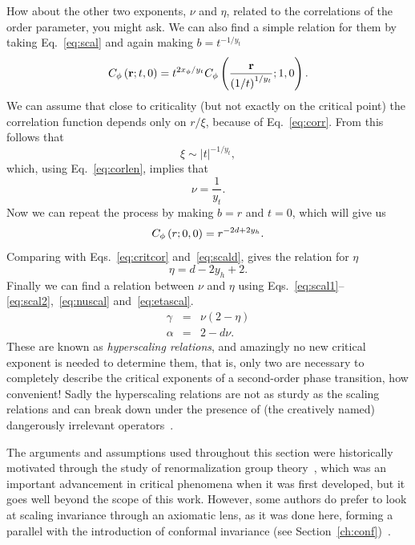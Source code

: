 How about the other two exponents, $\nu$ and $\eta$, related to the
correlations of the order parameter, you might ask. We can also find a simple
relation for them by taking Eq.~\ref{eq:scal} and again making $b=t^{-1/y_t}$
\begin{equation}
    C_{\phi}\left(\mathbf{r};t,0\right)=
    t^{2x_{\phi}/y_{t}}C_{\phi}
    \left(\frac{\mathbf{r}}{{\left(1/t\right)}^{1/y_{t}}};1,0\right).
\end{equation}
We can assume that close to criticality (but not exactly on the critical point)
the correlation function depends only on $r/\xi$, because of
Eq.~\ref{eq:corr}. From this follows that
\begin{equation}
    \xi\sim\left|t\right|^{-1/y_t},
\end{equation}
which, using Eq.~\ref{eq:corlen}, implies that
\begin{equation}
    \label{eq:nuscal}
    \nu=\frac{1}{y_t}.
\end{equation}
Now we can repeat the process by making $b=r$ and $t=0$, which will give us
\begin{equation}
    C_{\phi}\left(r;0,0\right)=r^{-2d+2y_{h}}.
\end{equation}
Comparing with Eqs.~\ref{eq:critcor} and~\ref{eq:scald}, gives the relation for
$\eta$
\begin{equation}
    \label{eq:etascal}
    \eta=d-2y_h+2.
\end{equation}
Finally we can find a relation between $\nu$ and $\eta$ using
Eqs.~\ref{eq:scal1}--\ref{eq:scal2},~\ref{eq:nuscal} and~\ref{eq:etascal}.
\begin{eqnarray}
    \label{eq:hs1}
    \gamma & = & \nu\left(2-\eta\right)\\
    \label{eq:hs2}
    \alpha & = & 2-d\nu.
\end{eqnarray}
These are known as \textit{hyperscaling relations}, and amazingly no new
critical exponent is needed to determine them, that is, only two are necessary
to completely describe the critical exponents of a second-order phase
transition, how convenient! Sadly the hyperscaling relations are not as sturdy
as the scaling relations and can break down under the presence of (the
creatively named) dangerously irrelevant operators~\cite{Nishimori2011}.

The arguments and assumptions used throughout this section were historically
motivated through the study of renormalization group
theory~\cite{Pelissetto2002}, which was an important advancement in critical
phenomena when it was first developed, but it goes well beyond the scope of
this work. However, some authors do prefer to look at scaling invariance
through an axiomatic lens, as it was done here, forming a parallel with the
introduction of conformal invariance (see
Section~\ref{ch:conf})~\cite{Henkel2013}.


